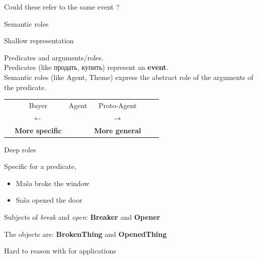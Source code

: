 \documentclass[10pt, compress]{beamer}
\begin{document}
\begin{frame}{}
\begin{center}
\begin{columns}
\begin{column}{0.5\textwidth}
\end{column}
\end{columns}

Could these refer to the same event ? 

\end{center}


\end{frame}

\begin{frame}[standout]
  Semantic roles
\end{frame}


\begin{frame}{Shallow representation}

Predicates and arguments/roles. \\

Predicates (like продать, купить) represent an \textbf{event}. \\

Semantic roles (like Agent, Theme) express the abstract role of the arguments of the predicate. \\


\begin{center}
\begin{tabular}{cccccc}
              & {\Large Buyer}        &  {\Large Agent} & {\Large Proto-Agent}      &   \\
              & $ {\Large \leftarrow}$ &                 & $ {\Large \rightarrow} $  &  \\
              & \textbf{More specific} &                  &  \textbf{More general}   &
  
\end{tabular}
\end{center}

\end{frame}

\begin{frame}{Deep roles}

Specific for a predicate,

\begin{itemize}
  \item Maša broke the window 
  \item Saša opened the door
\end{itemize}

Subjects of \emph{break} and \emph{open}: {\bf Breaker} and {\bf Opener}

The objects are: {\bf BrokenThing} and {\bf OpenedThing}

Hard to reason with for applications

\end{frame}
\end{document}
